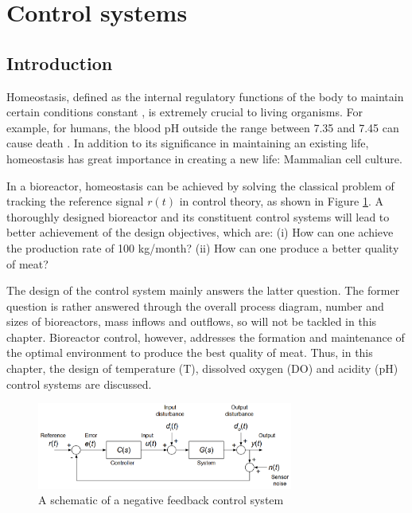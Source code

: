 \newpage
\section{Control systems}
\vspace{-3mm}
\subsection{Introduction}
\vspace{-3mm}



Homeostasis, defined as the internal regulatory functions of the body to maintain certain conditions constant \cite{E-Guyton2006, E-Aging2022}, is extremely crucial to living organisms. For example, for humans, the blood pH outside the range between 7.35 and 7.45 can cause death \cite{E-Donaldson2013}. In addition to its significance in maintaining an existing life, homeostasis has great importance in creating a new life: Mammalian cell culture.

In a bioreactor, homeostasis can be achieved by solving the classical problem of tracking the reference signal $r(t)$ in control theory, as shown in Figure \ref{figure:E-1-1-control-system}. A thoroughly designed bioreactor and its constituent control systems will lead to better achievement of the design objectives, which are: (i) How can one achieve the production rate of 100 kg/month? (ii) How can one produce a better quality of meat?

The design of the control system mainly answers the latter question. The former question is rather answered through the overall process diagram, number and sizes of bioreactors, mass inflows and outflows, so will not be tackled in this chapter. Bioreactor control, however, addresses the formation and maintenance of the optimal environment to produce the best quality of meat. Thus, in this chapter, the design of temperature (T), dissolved oxygen (DO) and acidity (pH) control systems are discussed.

\begin{figure}[h]
    \centering
    \includegraphics[width=0.75\textwidth]{eunsoo/E-1-1-control-system.png}
    \hfill
    \caption{A schematic of a negative feedback control system \cite{E-Cannon2022}}
    \label{figure:E-1-1-control-system}
\end{figure}

